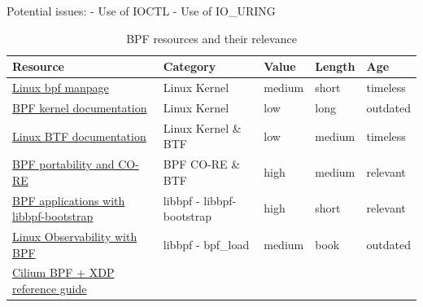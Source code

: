 \documentclass[conference]{IEEEtran}
\newcommand\bashstyle{
	\lstset{
		language=Bash,
		basicstyle=\ttm,
		showstringspaces=false,
		tabsize=2,
		aboveskip=0.2cm,
		belowskip=0.2cm,
		prebreak=\textbackslash,
		extendedchars=true,
		mathescape=false,
		linewidth=8.85cm,
		breaklines=true
	}
}
\newcommand\bashexternal[2][]{{\bashstyle}}
\begin{document}
Potential issues:
 - Use of IOCTL
 - Use of IO_URING




\begin{table}[h!]
	\caption{BPF resources and their relevance}
	\label{table:bpfresources}
	\centering
	\begin{adjustbox}{width=0.5\textwidth}
		\begin{threeparttable}[]
			\begin{tabular}{lllll}
				\toprule
				\textbf{Resource} & \textbf{Category} & \textbf{Value} &
				\textbf{Length} & \textbf{Age} \\
				\midrule
				\href{https://www.man7.org/linux/man-pages/man2/bpf.2.html}{Linux bpf manpage}\cite{bpfman} &
				Linux Kernel & medium & short & timeless \\
				\href{https://www.kernel.org/doc/Documentation/networking/filter.txt}{BPF kernel documentation}\cite{Linuxbpf} &
				Linux Kernel & low & long & outdated \\
				\href{https://www.kernel.org/doc/html/latest/bpf/btf.html}{Linux BTF documentation}\cite{Linuxbtf} &
				Linux Kernel \& BTF & low & medium & timeless \\
				\href{https://facebookmicrosites.github.io/bpf/blog/2020/02/19/bpf-portability-and-co-re.html}{BPF portability and CO-RE}\cite{bpfport} &
				BPF CO-RE \& BTF & high & medium & relevant \\
				\href{https://nakryiko.com/posts/libbpf-bootstrap/}{BPF applications with libbpf-bootstrap}\cite{bpfapplications} &
				libbpf - libbpf-bootstrap & high & short & relevant \\
				\href{https://www.oreilly.com/library/view/linux-observability-with/9781492050193/}{Linux Observability with BPF}\cite{observabilityoreilly} &
				libbpf - bpf\_load & medium & book & outdated \\
				\href{https://facebookmicrosites.github.io/bpf/blog/2020/02/19/bpf-portability-and-co-re.html}{Cilium BPF + XDP reference guide}\cite{ciliumbpf} &

\end{tabular}
\end{threeparttable}
\end{adjustbox}
\end{table}
\end{document}
